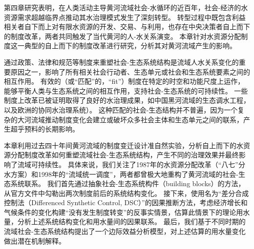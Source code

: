 第四章研究表明，在人类活动主导黄河流域社会-水循环的近百年，社会-经济的水资源需求超越临界点推动其水治理模式发生了深刻转型。
转型过程中既包含利益相关者自下而上对有限水资源的开发、交易、与利用，也存在中央决策者自上而下的制度改革，两者共同触发了当代黄河的人-水关系演变。
本章针对水资源分配制度这一典型的自上而下的制度改革进行研究，分析其对黄河流域产生的影响。

通过政策、法律和规范等制度来重塑社会-生态系统结构是流域人水关系变化的重要原因之一，影响了所有相关社会行动者、生态单元或社会和生态系统要素之间的相互作用\cite{lien2020, bodin2017b}。
有效的（或“匹配”的，``fit''）制度在特定的时空和功能尺度上运作，能够平衡人类与生态系统之间的相互作用，支持社会-生态系统的可持续性\cite{epstein2015, wang2019d}。
一些制度上改革已被证明取得了良好的水治理成果，如中国黑河流域的生态调水工程\cite{wang2019d}，以及欧洲的协同水治理系统\cite{green2013}）。
这种匹配的社会-生态结构并不普遍，因为一个复杂的大河流域推动制度变化会建立或破坏众多社会主体和生态单元之间的联系，产生超乎预料的长期影响。

本章利用过去四十年间黄河流域的制度变迁设计准自然实验，分析自上而下的水资源分配制度改革如何重塑流域社会-生态系统结构，产生不同的治理效果并最终影响了流域可持续性。
具体来说，我们关注了1987年的水资源分配改革（“八七”分水方案）和1998年的“流域统一调度”，两者都曾极大地重构了黄河流域的社会-生态系统联系。
我们首先通过抽象社会-生态系统构件（building blocks）的方法，从官方文件中勾勒出两次制度前后的系统结构变化。
接下来，使用名为“差分合成控制法（Differenced Synthetic Control, DSC）”的因果推断方法\cite{arkhangelsky2021}，考虑经济增长和气候条件的变化构建“没有发生制度转变”的反事实情景，估算此情景下的理论用水量，分析上述系统结构变化和用水量间的因果联系。
最后，我们基于不同时期的流域社会-生态系统结构提出了一个边际效益分析模型，对上述估算的用水量变化做出潜在机制解释。
